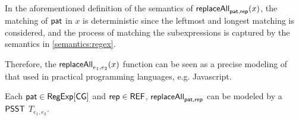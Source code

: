 \begin{remark}
  In the aforementioned definition of the semantics of $\mathsf{replaceAll}_{\mathsf{pat},\mathsf{rep}}(x)$, the matching of $\mathsf{pat}$ in $x$ is deterministic since the leftmost and longest matching is considered, and the process of matching the subexpressions is captured by the semantics in \ref{semantics:regex}.
  
Therefore, the $\mathsf{replaceAll}_{e_1,e_2}(x)$ function can be seen as a precise modeling of that used in practical programming languages, e.g. Javascript. 
\end{remark}


\begin{theorem}
  Each $\mathsf{pat} \in {\sf RegExp}[\sf CG]$ and $\mathsf{rep} \in {\sf REF}$, $\mathsf{replaceAll}_{\mathsf{pat}, \mathsf{rep}}$ can be modeled by a ${\sf PSST}${} $T_{e_1,e_2}$.
\end{theorem}

